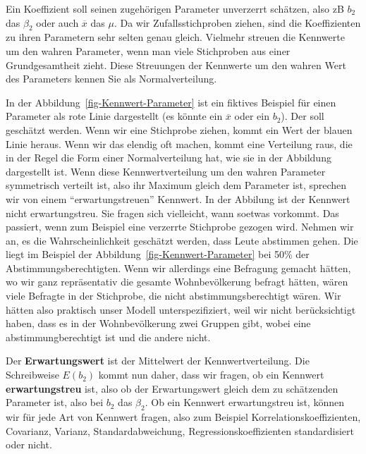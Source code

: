 \documentclass[
  10pt,
  letterpaper,
  a4paper, twoside]{scrreprt}
\begin{document}
\begin{tcolorbox}[enhanced jigsaw, coltitle=black, opacitybacktitle=0.6, toptitle=1mm, colbacktitle=quarto-callout-important-color!10!white, colback=white, toprule=.15mm, opacityback=0, bottomrule=.15mm, arc=.35mm, colframe=quarto-callout-important-color-frame, leftrule=.75mm, titlerule=0mm, breakable, left=2mm, rightrule=.15mm, title={Q\&A: Was ist mit \(\boldsymbol{E(b_2)}\) gemeint? Erwartungstreue und
Erwartungswert erklärt:}, bottomtitle=1mm]

Ein Koeffizient soll seinen zugehörigen Parameter unverzerrt schätzen,
also zB \(b_2\) das \(\beta_2\) oder auch \(\overline{x}\) das \(\mu\).
Da wir Zufallsstichproben ziehen, sind die Koeffizienten zu ihren
Parametern sehr selten genau gleich. Vielmehr streuen die Kennwerte um
den wahren Parameter, wenn man viele Stichproben aus einer
Grundgesamtheit zieht. Diese Streuungen der Kennwerte um den wahren Wert
des Parameters kennen Sie als Normalverteilung.

In der Abbildung~\ref{fig-Kennwert-Parameter} ist ein fiktives Beispiel
für einen Parameter als rote Linie dargestellt (es könnte ein
\(\overline{x}\) oder ein \(b_2\)). Der soll geschätzt werden. Wenn wir
eine Stichprobe ziehen, kommt ein Wert der blauen Linie heraus. Wenn wir
das elendig oft machen, kommt eine Verteilung raus, die in der Regel die
Form einer Normalverteilung hat, wie sie in der Abbildung dargestellt
ist. Wenn diese Kennwertverteilung um den wahren Parameter symmetrisch
verteilt ist, also ihr Maximum gleich dem Parameter ist, sprechen wir
von einem \enquote{erwartungstreuen} Kennwert. In der Abbilung ist der
Kennwert nicht erwartungstreu. Sie fragen sich vielleicht, wann soetwas
vorkommt. Das passiert, wenn zum Beispiel eine verzerrte Stichprobe
gezogen wird. Nehmen wir an, es die Wahrscheinlichkeit geschätzt werden,
dass Leute abstimmen gehen. Die liegt im Beispiel der
Abbildung~\ref{fig-Kennwert-Parameter} bei 50\% der
Abstimmungsberechtigten. Wenn wir allerdings eine Befragung gemacht
hätten, wo wir ganz repräsentativ die gesamte Wohnbevölkerung befragt
hätten, wären viele Befragte in der Stichprobe, die nicht
abstimmungsberechtigt wären. Wir hätten also praktisch unser Modell
unterspezifiziert, weil wir nicht berücksichtigt haben, dass es in der
Wohnbevölkerung zwei Gruppen gibt, wobei eine abstimmungberechtigt ist
und die andere nicht.

Der \textbf{Erwartungswert} ist der Mittelwert der Kennwertverteilung.
Die Schreibweise \(E(b_2)\) kommt nun daher, dass wir fragen, ob ein
Kennwert \textbf{erwartungstreu} ist, also ob der Erwartungswert gleich
dem zu schätzenden Parameter ist, also bei \(b_2\) das \(\beta_2\). Ob
ein Kennwert erwartungstreu ist, können wir für jede Art von Kennwert
fragen, also zum Beispiel Korrelationskoeffizienten, Covarianz, Varianz,
Standardabweichung, Regressionskoeffizienten standardisiert oder nicht.


\end{tcolorbox}
\end{document}
